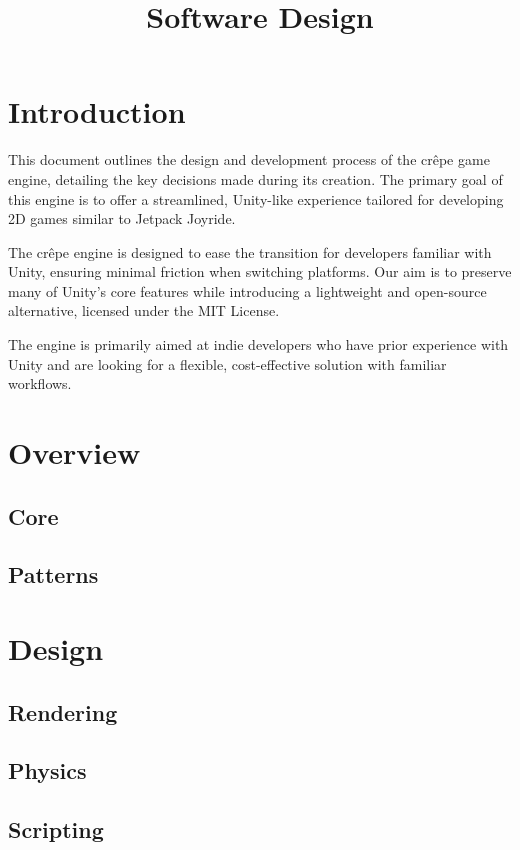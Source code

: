\documentclass{projdoc}
\title{Software Design}
\begin{document}
\tablestables
\newpage

\section{Introduction}

This document outlines the design and development process of the cr\^epe game engine,
detailing the key decisions made during its creation. The primary goal of this engine
is to offer a streamlined, Unity-like experience tailored for developing 2D games
similar to Jetpack Joyride.

The cr\^epe engine is designed to ease the transition for developers familiar with
Unity, ensuring minimal friction when switching platforms. Our aim is to preserve
many of Unity’s core features while introducing a lightweight and open-source
alternative, licensed under the MIT License.

The engine is primarily aimed at indie developers who have prior experience with
Unity and are looking for a flexible, cost-effective solution with familiar
workflows.

\section{Overview}

\subsection{Core}

\subsection{Patterns}

\section{Design}

\subsection{Rendering}

\subsection{Physics}

\subsection{Scripting}
\end{document}
